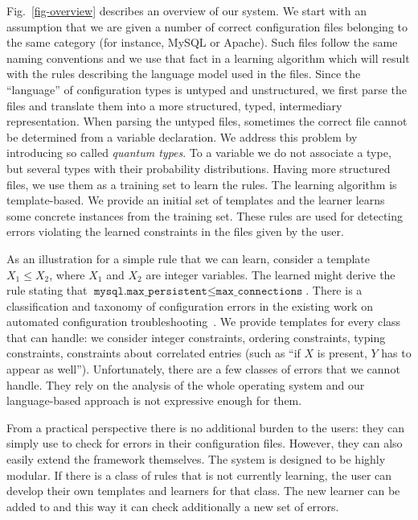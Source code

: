 Fig.~\ref{fig-overview} describes an overview of our system. We start
with an assumption that we are given a number of correct configuration
files belonging to the same category (for instance, MySQL or
Apache). Such files follow the same naming conventions and we use that
fact in a learning algorithm which will result with the rules
describing the language model used in the files. Since the
``language'' of configuration types is untyped and unstructured, we
first parse the files and translate them into a more structured,
typed, intermediary representation. When parsing the untyped files, sometimes the correct file cannot be determined from a variable declaration. We address this problem by introducing so called {\emph{quantum types}}. To a variable we do not associate a type, but several types with their probability distributions. Having more structured files, we
use them as a training set to learn the rules. The learning algorithm
is template-based. We provide an initial set of templates and the
learner learns some concrete instances from the training set. These
rules are used for detecting errors violating the learned constraints
in the files given by the user.

As an 
illustration for a simple rule that we can learn, consider a template
 $X_1 \le X_2$, where $X_1$ and $X_2$ are
integer variables. The learned might derive the rule stating that
$\texttt{mysql.max\_persistent} \le \texttt{max\_connections}$. There is a classification and taxonomy of configuration errors in the 
existing work on automated configuration troubleshooting~\cite{yin11anempirical, configdataset}. We provide templates for every class that \app can handle: we consider integer constraints, ordering
constraints, typing constraints, constraints about correlated entries (such as ``if $X$ is present, $Y$ has to appear as well''). Unfortunately, there are a few classes of errors that we cannot handle. They
 rely on the analysis of the whole operating system and our language-based
approach is not expressive enough for them. 

From a  practical perspective there is no additional burden 
to the users: they can simply use \app to check for errors in their configuration files. However, they can also easily extend the framework themselves. The system is designed to be highly modular. If there is a class of rules that \app is not currently learning, the user can develop their own templates and learners for that class. The new learner can be added to \app and this way it can check additionally a new set of errors.

